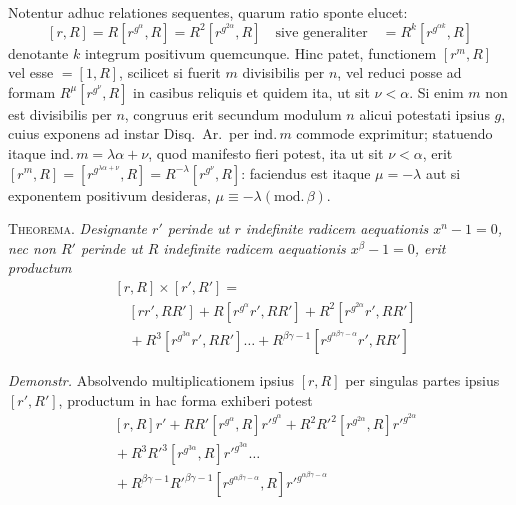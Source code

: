 Notentur adhuc relationes sequentes, quarum ratio sponte elucet:
\[
[r,R]=R[r^{g^\alpha},R]=R^2[r^{g^{2\alpha}},R]\quad\text{sive generaliter}\quad=R^k[r^{g^{\alpha k}},R]
\]
denotante $k$ integrum positivum quemcunque. Hinc patet, functionem $[r^m,R]$ vel esse $=[1,R]$, scilicet si fuerit $m$ divisibilis per $n$, vel reduci posse ad formam $R^\mu[r^{g^\nu},R]$ in casibus reliquis et quidem ita, ut sit $\nu<\alpha$. Si enim $m$ non est divisibilis per $n$, congruus erit secundum modulum $n$ alicui potestati ipsius $g$, cuius exponens ad instar Disq.\ Ar.\ per $\mathrm{ind.}\,m$ commode exprimitur; statuendo itaque $\mathrm{ind.}\,m=\lambda\alpha+\nu$, quod manifesto fieri potest, ita ut sit $\nu<\alpha$, erit $[r^m,R]=[r^{g^{\lambda\alpha+\nu}},R]=R^{-\lambda}[r^{g^\nu},R]$: faciendus est itaque $\mu=-\lambda$ aut si exponentem positivum desideras, $\mu\equiv-\lambda(\mathrm{mod.}\,\beta)$.

\textsc{Theorema.} \emph{Designante $r'$ perinde ut $r$ indefinite radicem aequationis $x^n-1=0$, nec non $R'$ perinde ut $R$ indefinite radicem aequationis $x^\beta-1=0$, erit productum}
\[
\begin{aligned}
&[r,R]\times[r',R']=\\
&\quad[rr',RR']+R[r^{g^\alpha}r',RR']+R^2[r^{g^{2\alpha}}r',RR']\\
&\quad{}+R^3[r^{g^{3\alpha}}r',RR']\ldots+R^{\beta\gamma-1}[r^{g^{\alpha\beta\gamma-\alpha}}r',RR']
\end{aligned}
\]

\emph{Demonstr.} Absolvendo multiplicationem ipsius $[r,R]$ per singulas partes ipsius $[r',R']$, productum in hac forma exhiberi potest
\[
\begin{aligned}
&[r,R]r'+RR'[r^{g^\alpha},R]r'^{g^\alpha}+R^2R'^2[r^{g^{2\alpha}},R]r'^{g^{2\alpha}}\\
&{}+R^3R'^3[r^{g^{3\alpha}},R]r'^{g^{3\alpha}}\ldots\\
&{}+R^{\beta\gamma-1}R'^{\beta\gamma-1}[r^{g^{\alpha\beta\gamma-\alpha}},R]r'^{g^{\alpha\beta\gamma-\alpha}}
\end{aligned}
\]

